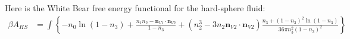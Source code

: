  



  Here is the White Bear free energy functional for the hard-sphere
  fluid:~\cite{roth2002whitebear}
  \begin{align}
    \beta A_{HS} &= \int \left\{
    -n_0 \ln\left( 1 - n_3\right)
    + \frac{n_1 n_2 - \mathbf{n}_{V1} \cdot\mathbf{n}_{V2}}{1-n_3}
    + (n_2^3 - 3 n_2 \mathbf{n}_{V2} \cdot \mathbf{n}_{V2}) \frac{
      n_3 + (1-n_3)^2 \ln(1-n_3)
    }{
      36\pi n_3^2(1-n_3)^2
    }
    \right\}
\end{align}


